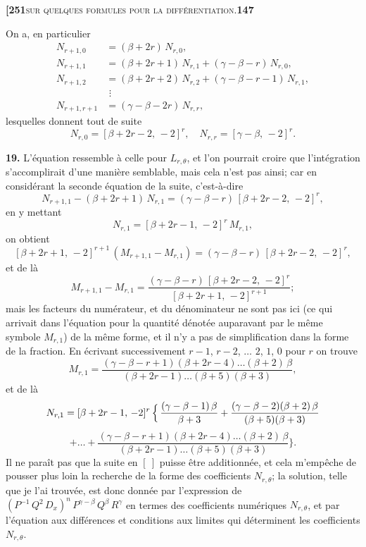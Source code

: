 \documentclass[11pt]{article}
\begin{document}
\newpage

\noindent\textbf{[251}\hfill\textsc{sur quelques formules pour la différentiation.}\hfill\textbf{147}

\medskip

\noindent On a, en particulier
\begin{align*}
N_{r+1,0} &= (\beta + 2r)\,N_{r,0},\\
N_{r+1,1} &= (\beta + 2r + 1)\,N_{r,1} + (\gamma - \beta - r)\,N_{r,0},\\
N_{r+1,2} &= (\beta + 2r + 2)\,N_{r,2} + (\gamma - \beta - r - 1)\,N_{r,1},\\
&\,\,\vdots\\
N_{r+1,r+1} &= (\gamma - \beta - 2r)\,N_{r,r},
\end{align*}
lesquelles donnent tout de suite
\[
N_{r,0} = [\beta + 2r - 2,\,-2]^{r},\quad N_{r,r} = [\gamma - \beta,\,-2]^{r}.
\]

\medskip

\textbf{19.} L'équation ressemble à celle pour $L_{r,\theta}$, et l'on pourrait croire que l'intégration s'accomplirait d'une manière semblable, mais cela n'est pas ainsi; car en considérant la seconde équation de la suite, c'est-à-dire
\[
N_{r+1,1} - (\beta + 2r + 1)\,N_{r,1} = (\gamma - \beta - r)\,[\beta + 2r - 2,\,-2]^{r},
\]
en y mettant
\[
N_{r,1} = [\beta + 2r - 1,\,-2]^{r}\,M_{r,1},
\]
on obtient
\[
[\beta + 2r + 1,\,-2]^{r+1}\,(M_{r+1,1} - M_{r,1}) = (\gamma - \beta - r)\,[\beta + 2r - 2,\,-2]^{r},
\]
et de là
\[
M_{r+1,1} - M_{r,1} = \frac{(\gamma - \beta - r)\,[\beta + 2r - 2,\,-2]^{r}}{[\beta + 2r + 1,\,-2]^{r+1}};
\]
mais les facteurs du numérateur, et du dénominateur ne sont pas ici (ce qui arrivait dans l'équation pour la quantité dénotée auparavant par le même symbole $M_{r,1}$) de la même forme, et il n'y a pas de simplification dans la forme de la fraction. En écrivant successivement $r-1$, $r-2$, $\ldots$ $2$, $1$, $0$ pour $r$ on trouve
\[
M_{r,1} = \frac{(\gamma - \beta - r + 1)(\beta + 2r - 4)\ldots(\beta + 2)\,\beta}{(\beta + 2r - 1)\ldots(\beta + 5)(\beta + 3)},
\]
et de là
\[
N_{r,1} = [\beta + 2r - 1,\,-2]^{r}\,\Bigl\{\, \frac{(\gamma - \beta - 1)\,\beta}{\beta + 3} + \frac{(\gamma - \beta - 2)(\beta + 2)\,\beta}{(\beta + 5)(\beta + 3)}
\]
\[
+ \ldots + \frac{(\gamma - \beta - r + 1)(\beta + 2r - 4)\ldots(\beta + 2)\,\beta}{(\beta + 2r - 1)\ldots(\beta + 5)(\beta + 3)}\Bigr\}.
\]
Il ne paraît pas que la suite en $[\ ]$ puisse être additionnée, et cela m'empêche de pousser plus loin la recherche de la forme des coefficients $N_{r,\theta}$; la solution, telle que je l'ai trouvée, est donc donnée par l'expression de $(P^{-1}\,Q^2\,D_x)^n\,P^{\gamma-\beta}\,Q^{\beta}\,R^{\gamma}$ en termes des coefficients numériques $N_{r,\theta}$, et par l'équation aux différences et conditions aux limites qui déterminent les coefficients $N_{r,\theta}$.
\end{document}
